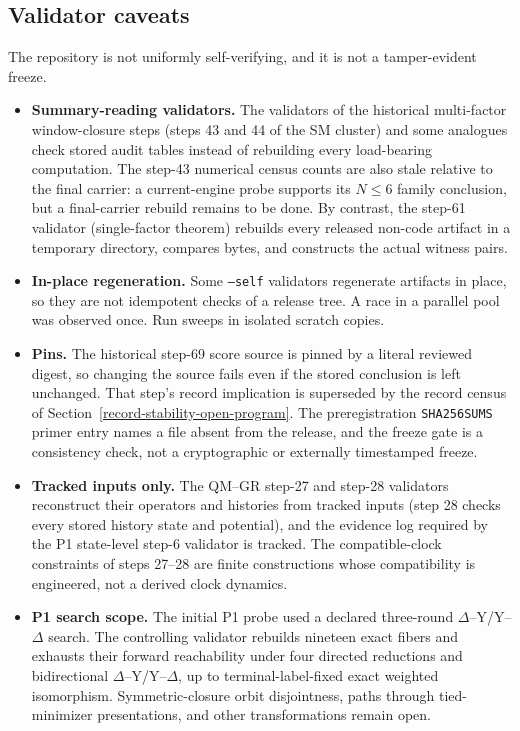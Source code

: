 \documentclass[11pt]{article}
\theoremstyle{definition}
\providecommand{\tightlist}{\setlength{\itemsep}{0pt}\setlength{\parskip}{0pt}}
\begin{document}
\subsection{Validator caveats}

The repository is not uniformly self-verifying, and it is not a tamper-evident freeze.

\begin{itemize}\tightlist
\item \textbf{Summary-reading validators.} The validators of the historical multi-factor window-closure steps
  (steps 43 and 44 of the SM cluster) and some analogues check stored audit tables instead of rebuilding every
  load-bearing computation. The step-43 numerical census counts are also stale relative to the final carrier: a
  current-engine probe supports its \(N\le6\) family conclusion, but a final-carrier rebuild remains to be done. By
  contrast, the step-61 validator (single-factor theorem) rebuilds every released non-code artifact in a temporary directory,
  compares bytes, and constructs the actual witness pairs.
\item \textbf{In-place regeneration.} Some \texttt{--self} validators regenerate artifacts in place, so they are not
  idempotent checks of a release tree. A race in a parallel pool was observed once. Run sweeps in isolated scratch
  copies.
\item \textbf{Pins.} The historical step-69 score source is pinned by a literal reviewed digest, so changing the
  source fails even if the stored conclusion is left unchanged. That step's record implication is superseded by the
  record census of Section~\ref{record-stability-open-program}. The preregistration \texttt{SHA256SUMS} primer entry
  names a file absent from the release, and the freeze gate is a consistency check, not a cryptographic or externally
  timestamped freeze.
\item \textbf{Tracked inputs only.} The QM--GR step-27 and step-28 validators reconstruct their operators and histories
  from tracked inputs (step 28 checks every stored history state and potential), and the evidence log required by the
  P1 state-level step-6 validator is tracked. The compatible-clock constraints of steps 27--28 are finite
  constructions whose compatibility is engineered, not a derived clock dynamics.
\item \textbf{P1 search scope.} The initial P1 probe used a declared three-round \(\Delta\)--Y/Y--\(\Delta\) search. The
  controlling validator rebuilds nineteen exact fibers and exhausts their forward reachability under four directed
  reductions and bidirectional \(\Delta\)--Y/Y--\(\Delta\), up to terminal-label-fixed exact weighted isomorphism.
  Symmetric-closure orbit disjointness, paths through tied-minimizer presentations, and other transformations remain
  open.
\end{itemize}
\end{document}
